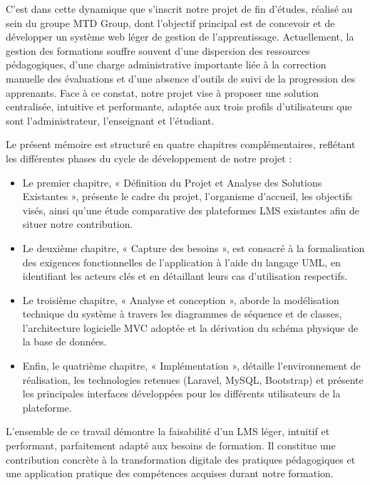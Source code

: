 \documentclass[12pt,a4paper]{report}
\begin{document}
C'est dans cette dynamique que s'inscrit notre projet de fin d'études, réalisé au sein du groupe MTD Group, dont l'objectif principal est de concevoir et de développer un système web léger de gestion de l'apprentissage. Actuellement, la gestion des formations souffre souvent d'une dispersion des ressources pédagogiques, d'une charge administrative importante liée à la correction manuelle des évaluations et d'une absence d'outils de suivi de la progression des apprenants. Face à ce constat, notre projet vise à proposer une solution centralisée, intuitive et performante, adaptée aux trois profils d'utilisateurs que sont l'administrateur, l'enseignant et l'étudiant.

Le présent mémoire est structuré en quatre chapitres complémentaires, reflétant les différentes phases du cycle de développement de notre projet :
\begin{itemize}
    \item Le premier chapitre, « Définition du Projet et Analyse des Solutions Existantes », présente le cadre du projet, l'organisme d'accueil, les objectifs visés, ainsi qu'une étude comparative des plateformes LMS existantes afin de situer notre contribution.
    \item Le deuxième chapitre, « Capture des besoins », est consacré à la formalisation des exigences fonctionnelles de l'application à l'aide du langage UML, en identifiant les acteurs clés et en détaillant leurs cas d'utilisation respectifs.
    \item Le troisième chapitre, « Analyse et conception », aborde la modélisation technique du système à travers les diagrammes de séquence et de classes, l'architecture logicielle MVC adoptée et la dérivation du schéma physique de la base de données.
    \item Enfin, le quatrième chapitre, « Implémentation », détaille l'environnement de réalisation, les technologies retenues (Laravel, MySQL, Bootstrap) et présente les principales interfaces développées pour les différents utilisateurs de la plateforme.
\end{itemize}

L'ensemble de ce travail démontre la faisabilité d'un LMS léger, intuitif et performant, parfaitement adapté aux besoins de formation. Il constitue une contribution concrète à la transformation digitale des pratiques pédagogiques et une application pratique des compétences acquises durant notre formation.
\clearpage

\end{document}
